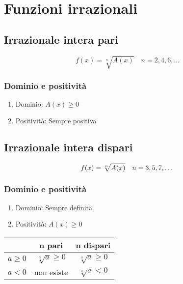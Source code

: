 \chapter{Funzioni irrazionali}
\section{Irrazionale intera pari}
\begin{equation*}
f(x)=\sqrt[n]{A(x)}\quad n=2,4,6,\dots
\end{equation*}
\subsection{Dominio e positività}
\begin{enumerate}
	\item Dominio: $A(x)\geq 0$
	\item Positività: Sempre positiva
\end{enumerate}
\section{Irrazionale intera dispari}
\begin{equation*}\index{Funzione!irrazionale!dispari}
f(x)=\sqrt[n]{A(x)}\quad n=3,5,7,\dots
\end{equation*}
\subsection{Dominio e positività}
\begin{enumerate}
	\item Dominio: Sempre definita
	\item Positività: $A(x)\geq 0$
\end{enumerate}
{\centering{}
	\begin{tabular}{m{40pt}cc}
	\toprule	
	& n pari & n dispari \\
	\midrule
$a \geqslant 0$	& $\sqrt[a]{a}\geqslant 0$ & $\sqrt[a]{a}\geqslant 0$\\[0.5cm] 
$a<0$	& non esiste &  $\sqrt[a]{a}< 0$ \\ 
\bottomrule
\end{tabular}\par}
